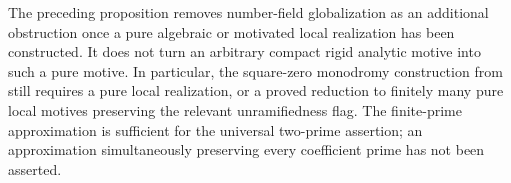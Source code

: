 \begin{remark}
\label{c:bgv-pure-local-boundary}
The preceding proposition removes number-field globalization as
an additional obstruction once a pure algebraic or motivated
local realization has been constructed.
It does not turn an arbitrary compact rigid analytic motive
into such a pure motive. In particular, the square-zero
monodromy construction from
\citet[Corollary~4.14]{c_bgv2024monodromy}
still requires a pure local realization, or a proved reduction
to finitely many pure local motives preserving the relevant
unramifiedness flag. The finite-prime approximation is sufficient
for the universal two-prime assertion; an approximation
simultaneously preserving every coefficient prime has not been
asserted.
\end{remark}

